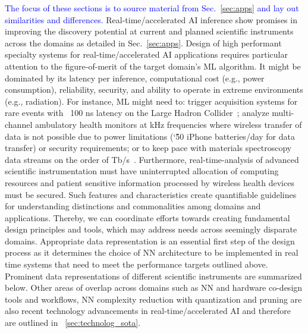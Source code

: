 \noindent 
\textcolor{blue}{
The focus of these sections is to source material from Sec.~\ref{sec:apps} and lay out similarities and differences.
}
Real-time/accelerated AI inference show promises in improving the discovery potential at current and planned scientific instruments across the domains as detailed in Sec.~\ref{sec:apps}. Design of high performant specialty systems for real-time/accelerated AI applications requires particular attention to the figure-of-merit of the target domain's ML algorithm. It might be dominated by its latency per inference, computational cost (e.g., power consumption), reliability, security, and ability to operate in extreme environments (e.g., radiation). For instance, ML might need to: trigger acquisition systems for rare events with ~100 ns latency on the Large Hadron Collider~\cite{Duarte:2018ite}; analyze multi-channel ambulatory health monitors at kHz frequencies where wireless transfer of data is not possible due to power limitations (\char`\~50 iPhone batteries/day for data transfer) or security requirements; or to keep pace with materials spectroscopy data streams on the order of Tb/s~\cite{Hart2017-bf}. Furthermore, real-time-analysis of advanced scientific instrumentation must have uninterrupted allocation of computing resources and patient sensitive information processed by wireless health devices must be secured. Such features and characteristics create quantifiable guidelines for understanding distinctions and commonalities among domains and applications. Thereby, we can coordinate efforts towards creating fundamental design principles and tools, which may address needs across seemingly disparate domains. Appropriate data representation is an essential first step of the design process as it determines the choice of NN architecture to be implemented in real time systems that need to meet the performance targets outlined above. Prominent data representations of different scientific instruments are summarized below. Other areas of overlap across domains such as NN and hardware co-design tools and workflows, NN complexity reduction with quantization and pruning are also recent technology advancements in real-time/accelerated AI and therefore are outlined in ~\ref{sec:technolog_sota}.
